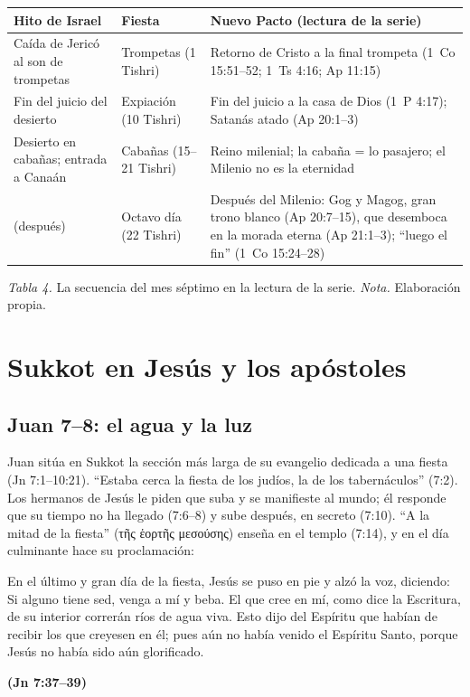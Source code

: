 \documentclass[11pt,letterpaper]{article}
\newcommand{\grc}[1]{\foreignlanguage{ancientgreek}{#1}}
\newcommand{\fuente}[1]{\par\hfill{\upshape\bfseries\small\textcolor{tierraroja}{#1}}}
\begin{document}
\begin{center}\begin{minipage}{\linewidth}\centering\small\renewcommand{\arraystretch}{1.22}
\begin{tabular}{@{}L{3.6cm}L{3.0cm}L{7.8cm}@{}}
\toprule
\textbf{Hito de Israel} & \textbf{Fiesta} & \textbf{Nuevo Pacto (lectura de la serie)} \\ \midrule
Caída de Jericó al son de trompetas & Trompetas (1 Tishri) & Retorno de Cristo a la final trompeta (1~Co 15:51--52; 1~Ts 4:16; Ap 11:15) \\
Fin del juicio del desierto & Expiación (10 Tishri) & Fin del juicio a la casa de Dios (1~P 4:17); Satanás atado (Ap 20:1--3) \\
Desierto en cabañas; entrada a Canaán & Cabañas (15--21 Tishri) & Reino milenial; la cabaña = lo pasajero; el Milenio no es la eternidad \\
(después) & Octavo día (22 Tishri) & Después del Milenio: Gog y Magog, gran trono blanco (Ap 20:7--15), que desemboca en la morada eterna (Ap 21:1--3); ``luego el fin'' (1~Co 15:24--28) \\
\bottomrule
\end{tabular}\par
{\footnotesize\color{sepia}\textit{Tabla 4.} La secuencia del mes séptimo en la lectura de la serie. \textit{Nota.} Elaboración propia.}
\end{minipage}\end{center}

\section{Sukkot en Jesús y los apóstoles}

\subsection{Juan 7--8: el agua y la luz}
Juan sitúa en Sukkot la sección más larga de su evangelio dedicada a una fiesta (Jn 7:1--10:21). ``Estaba cerca la fiesta de los judíos, la de los tabernáculos'' (7:2). Los hermanos de Jesús le piden que suba y se manifieste al mundo; él responde que su tiempo no ha llegado (7:6--8) y sube después, en secreto (7:10). ``A la mitad de la fiesta'' (\grc{τῆς ἑορτῆς μεσούσης}) enseña en el templo (7:14), y en el día culminante hace su proclamación:

\begin{cita}En el último y gran día de la fiesta, Jesús se puso en pie y alzó la voz, diciendo: Si alguno tiene sed, venga a mí y beba. El que cree en mí, como dice la Escritura, de su interior correrán ríos de agua viva. Esto dijo del Espíritu que habían de recibir los que creyesen en él; pues aún no había venido el Espíritu Santo, porque Jesús no había sido aún glorificado.\fuente{(Jn 7:37--39)}\end{cita}
\end{document}
